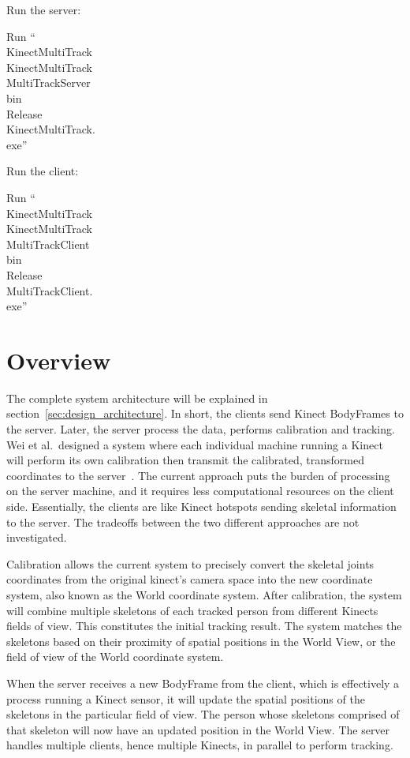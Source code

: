 Run the server:

{\centering
  Run ``\\KinectMultiTrack\\KinectMultiTrack\\MultiTrackServer\\bin\\Release\\KinectMultiTrack.\\exe''
}

Run the client:

{\centering
  Run ``\\KinectMultiTrack\\KinectMultiTrack\\MultiTrackClient\\bin\\Release\\MultiTrackClient.\\exe''
}

\section{Overview}
\label{sec:current_approach_overview}

The complete system architecture will be explained in section~\ref{sec:design_architecture}. In short, the clients send Kinect BodyFrames to the server. Later, the server process the data, performs calibration and tracking. Wei et al.\ designed a system where each individual machine running a Kinect will perform its own calibration then transmit the calibrated, transformed coordinates to the server~\cite{wei_kinect_calibration}. The current approach puts the burden of processing on the server machine, and it requires less computational resources on the client side. Essentially, the clients are like Kinect hotspots sending skeletal information to the server. The tradeoffs between the two different approaches are not investigated.

Calibration allows the current system to precisely convert the skeletal joints coordinates from the original kinect's camera space into the new coordinate system, also known as the World coordinate system. After calibration, the system will combine multiple skeletons of each tracked person from different Kinects fields of view. This constitutes the initial tracking result. The system matches the skeletons based on their proximity of spatial positions in the World View, or the field of view of the World coordinate system.

When the server receives a new BodyFrame from the client, which is effectively a process running a Kinect sensor, it will update the spatial positions of the skeletons in the particular field of view. The person whose skeletons comprised of that skeleton will now have an updated position in the World View. The server handles multiple clients, hence multiple Kinects, in parallel to perform tracking.

